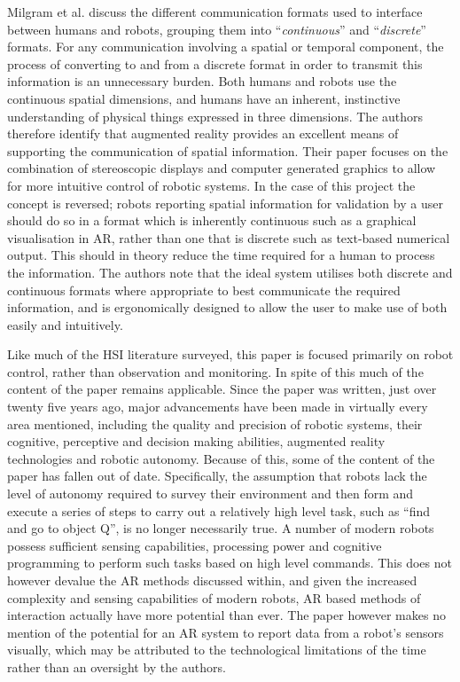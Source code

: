 Milgram et al. \cite{Milgram:1993} discuss the different communication formats used to interface between humans and robots, grouping them into ``\textit{continuous}'' and ``\textit{discrete}'' formats. For any communication involving a spatial or temporal component, the process of converting to and from a discrete format in order to transmit this information is an unnecessary burden. Both humans and robots use the continuous spatial dimensions, and humans have an inherent, instinctive understanding of physical things expressed in three dimensions. The authors \cite{Milgram:1993} therefore identify that  augmented reality provides an excellent means of supporting the communication of spatial information. Their paper focuses on the combination of stereoscopic displays and computer generated graphics to allow for more intuitive control of robotic systems. In the case of this project the concept is reversed; robots reporting spatial information for validation by a user should do so in a format which is inherently continuous such as a graphical visualisation in AR, rather than one that is discrete such as text-based numerical output. This should in theory reduce the time required for a human to process the information. The authors note \cite{Milgram:1993} that the ideal system utilises both discrete and continuous formats where appropriate to best communicate the required information, and is ergonomically designed to allow the user to make use of both easily and intuitively.

Like much of the HSI literature surveyed, this paper \cite{Milgram:1993} is focused primarily on robot control, rather than observation and monitoring. In spite of this much of the content of the paper remains applicable. Since the paper was written, just over twenty five years ago, major advancements have been made in virtually every area mentioned, including the quality and precision of robotic systems, their cognitive, perceptive and decision making abilities, augmented reality technologies and robotic autonomy. Because of this, some of the content of the paper has fallen out of date. Specifically, the assumption that robots lack the level of autonomy required to survey their environment and then form and execute a series of steps to carry out a relatively high level task, such as ``find and go to object Q''\cite{Milgram:1993}, is no longer necessarily true. A number of modern robots possess sufficient sensing capabilities, processing power and cognitive programming to perform such tasks based on high level commands. This does not however devalue the AR methods discussed within, and given the increased complexity and sensing capabilities of modern robots, AR based methods of interaction actually have more potential than ever. The paper however makes no mention of the potential for an AR system to report data from a robot's sensors visually, which may be attributed to the technological limitations of the time rather than an oversight by the authors.

